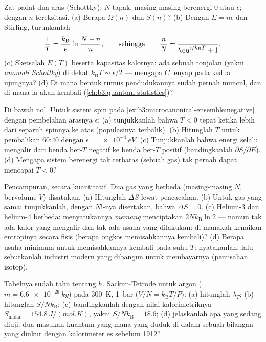 \begin{exercise}[$\star\star$]\label{exo:b3:microcanonical-ensemble:8}
Zat padat dua aras (Schottky): $N$ tapak, masing-masing berenergi $0$
atau $\epsilon$; dengan $n$ tereksitasi. (a) Berapa $\Omega(n)$ dan
$S(n)$? (b) Dengan $E =
n\epsilon$ dan Stirling, turunkanlah
\[
\frac1T = \frac{k_{\text{B}}}{\epsilon}\,
\ln\frac{N - n}{n} ,
\qquad\text{sehingga}\qquad
\frac nN = \frac{1}{\eu^{\epsilon/k_{\text{B}}T} + 1} .
\]
(c) Sketsalah $E(T)$ beserta kapasitas kalornya: ada sebuah tonjolan
(yakni \emph{anomali Schottky}) di dekat $k_{\text{B}}T \sim \epsilon/2$
--- mengapa $C$ lenyap pada kedua ujungnya? (d) Di mana bentuk rumus
pendudukannya sudah pernah muncul, dan di mana ia akan kembali
(\cref{ch:b3:quantum-statistics})?
\end{exercise}

\begin{exercise}[$\star\star$]\label{exo:b3:microcanonical-ensemble:9}
Di bawah nol. Untuk sistem spin pada
\cref{ex:b3:microcanonical-ensemble:negative} dengan pembelahan arasnya
$\epsilon$: (a) tunjukkanlah bahwa $T < 0$ tepat ketika lebih dari
separuh spinnya ke atas (populasinya terbalik). (b) Hitunglah $T$ untuk
pembalikan 60:40 dengan $\epsilon = \qty{e-4}{eV}$. (c) Tunjukkanlah
bahwa energi selalu mengalir dari benda ber-$T$ negatif ke benda ber-$T$
positif (bandingkanlah $\partial
S/\partial E$). (d) Mengapa sistem berenergi tak terbatas (sebuah gas)
tak pernah dapat mencapai $T < 0$?
\end{exercise}

\begin{exercise}[$\star\star\star$]\label{exo:b3:microcanonical-ensemble:10}
Pencampuran, secara kuantitatif. Dua gas yang berbeda (masing-masing $N$,
bervolume $V$) disatukan. (a) Hitunglah $\Delta S$ lewat pencacahan. (b)
Untuk gas yang sama: tunjukkanlah, dengan $N!$-nya disertakan, bahwa
$\Delta S = 0$. (c) Helium-3 dan helium-4 berbeda: menyatukannya
\emph{memang} menciptakan $2Nk_{\text{B}}\ln2$ --- namun tak ada kalor
yang mengalir dan tak ada usaha yang dilakukan: di manakah kenaikan
entropinya secara fisis (berapa ongkos memisahkannya kembali)? (d)
Berapa usaha minimum untuk memisahkannya kembali pada suhu $T$:
nyatakanlah, lalu sebutkanlah industri modern yang dibangun untuk
membayarnya (pemisahan isotop).
\end{exercise}

\begin{exercise}[$\star\star\star$]\label{exo:b3:microcanonical-ensemble:11}
Tabelnya sudah tahu tentang $h$. Sackur--Tetrode untuk argon ($m =
\qty{6.6e-26}{kg}$) pada \qty{300}{K}, \qty{1}{bar} ($V/N =
k_{\text{B}}T/P$): (a) hitunglah $\lambda_T$; (b) hitunglah $S/N
k_{\text{B}}$; (c) bandingkanlah dengan nilai kalorimetriknya
$S_{\text{molar}} = \qty{154.8}{J/(mol.K)}$, yakni $S/Nk_{\text{B}}
= 18.6$; (d) jelaskanlah apa yang sedang diuji: dua masukan kuantum yang
mana yang duduk di dalam sebuah bilangan yang diukur dengan kalorimeter
es sebelum 1912?
\end{exercise}

